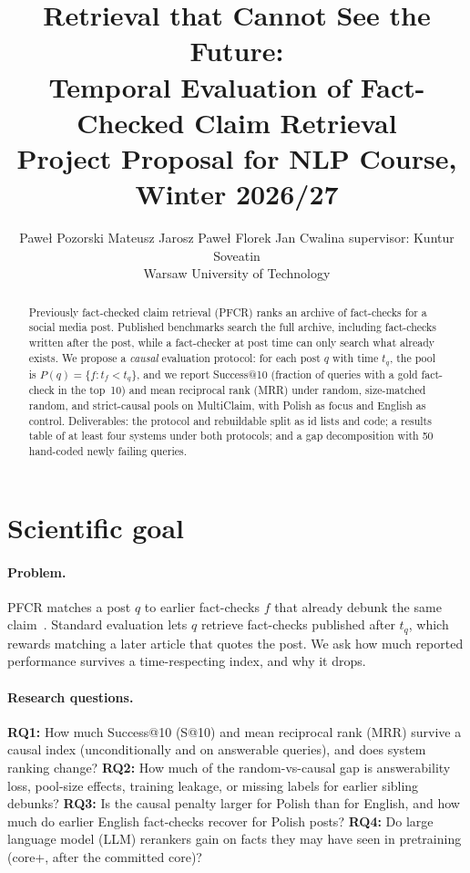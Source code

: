 \documentclass[11pt]{article}
\title{Retrieval that Cannot See the Future:\\
Temporal Evaluation of Fact-Checked Claim Retrieval\\
Project Proposal for NLP Course, Winter 2026/27}
\author{
  Pawe{\l} Pozorski
  \And
  Mateusz Jarosz
  \AND
  Pawe{\l} Florek
  \And
  Jan Cwalina
  \AND
  supervisor: Kuntur Soveatin \\
  Warsaw University of Technology
}
\date{}
\begin{document}
\maketitle

\begin{abstract}
Previously fact-checked claim retrieval (PFCR) ranks an archive of fact-checks for a social media post.
Published benchmarks search the full archive, including fact-checks written after the post, while a fact-checker at post time can only search what already exists.
We propose a \emph{causal} evaluation protocol: for each post $q$ with time $t_q$, the pool is $P(q)=\{f:t_f<t_q\}$, and we report Success@10 (fraction of queries with a gold fact-check in the top~10) and mean reciprocal rank (MRR) under random, size-matched random, and strict-causal pools on MultiClaim, with Polish as focus and English as control.
Deliverables: the protocol and rebuildable split as id lists and code; a results table of at least four systems under both protocols; and a gap decomposition with 50 hand-coded newly failing queries.
\end{abstract}

\section{Scientific goal}
\label{sec:goal}
\paragraph{Problem.}
PFCR matches a post $q$ to earlier fact-checks $f$ that already debunk the same claim~\cite{shaar2020that,pikuliak2023multilingual}.
Standard evaluation lets $q$ retrieve fact-checks published after $t_q$, which rewards matching a later article that quotes the post.
We ask how much reported performance survives a time-respecting index, and why it drops.

\paragraph{Research questions.}
\textbf{RQ1:} How much Success@10 (S@10) and mean reciprocal rank (MRR) survive a causal index (unconditionally and on answerable queries), and does system ranking change?
\textbf{RQ2:} How much of the random-vs-causal gap is answerability loss, pool-size effects, training leakage, or missing labels for earlier sibling debunks?
\textbf{RQ3:} Is the causal penalty larger for Polish than for English, and how much do earlier English fact-checks recover for Polish posts?
\textbf{RQ4:} Do large language model (LLM) rerankers gain on facts they may have seen in pretraining (core+, after the committed core)?
\end{document}
